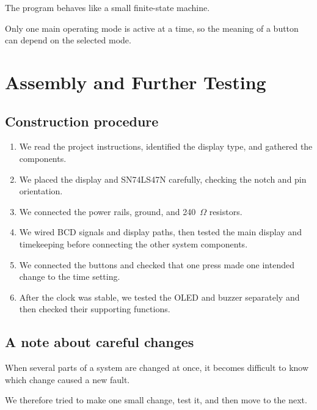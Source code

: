 \documentclass[12pt,letterpaper]{article}
\begin{document}
The program behaves like a small
finite-state machine.

Only one main operating mode is active at a time,
so the meaning of a button can depend
on the selected mode.
\clearpage
\section{Assembly and Further Testing}

\subsection{Construction procedure}

\begin{enumerate}

  \item
  We read the project instructions,
  identified the display type,
  and gathered the components.

  \item
  We placed the display and SN74LS47N carefully,
  checking the notch and pin orientation.

  \item
  We connected the power rails,
  ground,
  and 240~$\Omega$ resistors.

  \item
  We wired BCD signals and display paths,
  then tested the main display and timekeeping
  before connecting the other system components.

  \item
  We connected the buttons and checked that one press
  made one intended change to the time setting.

  \item
  After the clock was stable, we tested the OLED and buzzer
  separately and then checked their supporting functions.

\end{enumerate}

\subsection{A note about careful changes}

When several parts of a system are changed at once,
it becomes difficult to know which change
caused a new fault.

We therefore tried to make one small change,
test it,
and then move to the next.
\end{document}
